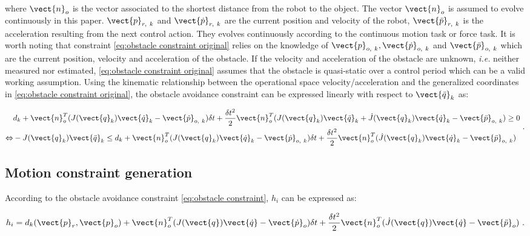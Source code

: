 \noindent where $\vect{n}_o$ is the vector associated to the shortest distance from the robot to the object. The vector $\vect{n}_o$ is assumed to evolve continuously in this paper. $\vect{p}_{r,~k}$ and $\vect{\dot{p}}_{r,~k}$ are the current position and velocity of the robot, $\vect{\ddot{p}}_{r,~k}$ is the acceleration resulting from the next control action. They evolves continuously according to the continuous motion task or force task. It is worth noting that constraint \eqref{eq:obstacle constraint original} relies on the knowledge of  $\vect{p}_{o,~k}, \vect{\dot{p}}_{o,~k}$ and $\vect{\ddot{p}}_{o,~k}$ which are the current position, velocity and acceleration of the obstacle. If the velocity and acceleration of the obstacle are unknown, \textit{i.e.} neither measured nor estimated, \eqref{eq:obstacle constraint original} assumes that the obstacle is quasi-static over a control period which can be a valid working assumption. Using the kinematic relationship between the operational space velocity/acceleration and the generalized coordinates in \eqref{eq:obstacle constraint original}, the obstacle avoidance constraint can be expressed linearly with respect to $\vect{\ddot{q}}_k$ as:
\begin{singlespace}
\begin{equation}\label{eq:obstacle constraint}
\begin{split}
& d_{k}  + \vect{n}_o^T(J(\vect{q}_k)\vect{\dot{q}}_k-\vect{\dot{p}}_{o,~k})\delta t+\frac{\delta t^2}{2}\vect{n}_o^T(J(\vect{q}_k)\vect{\ddot{q}}_{k}+\dot{J}(\vect{q}_k)\vect{\dot{q}}_k-\vect{\ddot{p}}_{o,~k})\geq 0 \\
\Leftrightarrow & -J(\vect{q}_k)\vect{\ddot{q}}_{k} \leq d_{k}  + \vect{n}_o^T(J(\vect{q}_k)\vect{\dot{q}}_k-\vect{\dot{p}}_{o,~k})\delta t+\frac{\delta t^2}{2}\vect{n}_o^T(\dot{J}(\vect{q}_k)\vect{\dot{q}}_k-\vect{\ddot{p}}_{o,~k}) 
\end{split}~.
\end{equation}
\end{singlespace}

\subsection{Motion constraint generation}
According to the obstacle avoidance constraint \eqref{eq:obstacle constraint}, $h_i$ can be expressed as:
\begin{singlespace}
\begin{equation}\label{eq:obstacle constraint h_i}
h_i=d_{k}(\vect{p}_{r},\vect{p}_{o})+\vect{n}_o^T(J(\vect{q})\vect{\dot{q}}-\vect{\dot{p}}_{o})\delta t +\frac{\delta t^2}{2}\vect{n}_o^T(\dot{J}(\vect{q})\vect{\dot{q}}-\vect{\ddot{p}}_{o}) ~.
\end{equation}  
\end{singlespace}

